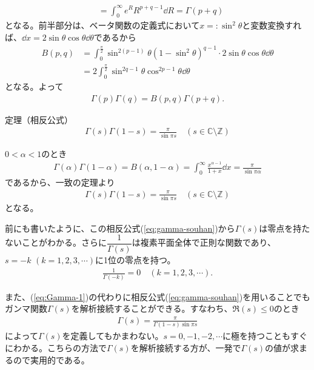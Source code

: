 \documentclass[11pt,b5paper,papersize,dvipdfmx]{jsbook}
\begin{document}
\begin{prf}
\begin{align*}
    &= \int_0^\infty e^R R^{p+q-1} \dd{R} = \Gamma(p+q)
  \end{align*}
  となる。前半部分は、ベータ関数の定義式において$x=:\sin^2\theta$と変数変換すれば、$\dd{x} = 2\sin\theta\cos\theta\dd{\theta}$であるから
  \begin{align*}
    B(p,q) &= \int_0^\frac{\pi}{2} \sin^{2(p-1)}\theta (1-\sin^2\theta)^{q-1} \cdot 2\sin\theta\cos\theta\dd{\theta}\\
    &= 2\int_0^\frac{\pi}{2} \sin^{2q-1}\theta \cos^{2p-1}\theta \dd{\theta}
  \end{align*}
  となる。よって
  \begin{align*}
    \Gamma(p) \Gamma(q) = B(p,q) \Gamma(p+q).
  \end{align*}
\end{prf}


\begin{thm}{定理（相反公式）}
  \begin{align}
    \Gamma(s)\Gamma(1-s) = \frac{\pi}{\sin \pi s}
    \quad (s\in\mathbb{C} \setminus \mathbb{Z})
    \label{eq:gamma-souhan}
  \end{align}
\end{thm}
\begin{prf}
  $0<\alpha<1$のとき
  \begin{align*}
    \Gamma(\alpha)\Gamma(1-\alpha) = B(\alpha,1-\alpha)
    = \int_0^\infty \frac{x^{\alpha-1}}{1+x} \dd{x}
    = \frac{\pi}{\sin \pi \alpha}
  \end{align*}
  であるから、一致の定理より
  \begin{align*}
    \Gamma(s)\Gamma(1-s) = \frac{\pi}{\sin \pi s}
    \quad (s\in\mathbb{C} \setminus \mathbb{Z})
  \end{align*}
  となる。
\end{prf}
\begin{remark}
  前にも書いたように、この相反公式(\ref{eq:gamma-souhan})から$\Gamma(s)$は零点を持たないことがわかる。さらに$\dfrac1{\Gamma(s)}$は複素平面全体で正則な関数であり、$s=-k\,\,(k=1,2,3,\cdots)$に1位の零点を持つ。
  \begin{align}
    \frac1{\Gamma(-k)} = 0 \quad (k= 1,2,3,\cdots).
  \end{align}
\end{remark}

また、(\ref{eq:Gamma-1})の代わりに相反公式(\ref{eq:gamma-souhan})を用いることでもガンマ関数$\Gamma(s)$を解析接続することができる。すなわち、$\Re(s)\le0$のとき
\begin{align}
  \Gamma(s) = \frac{\pi}{\Gamma(1-s) \sin \pi s}
\end{align}
によって$\Gamma(s)$を定義してもかまわない。$s=0,-1,-2,\cdots$に極を持つこともすぐにわかる。こちらの方法で$\Gamma(s)$を解析接続する方が、一発で$\Gamma(s)$の値が求まるので実用的である。
\end{document}
